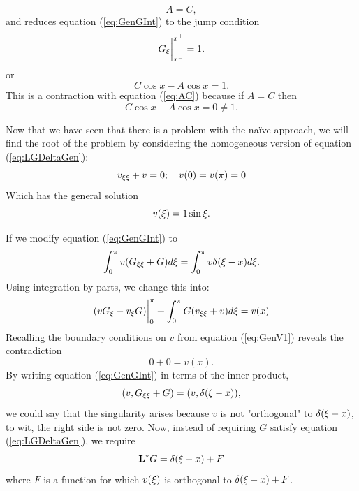     \begin{equation}\label{eq:AC}
        A=C,
    \end{equation}
    and reduces equation (\ref{eq:GenGInt}) to the jump condition 
    \begin{equation}\label{eq:genJump}
        G_\xi\biggr\rvert_{x^-}^{x^+} = 1.
    \end{equation}
    or
    \begin{equation*}
        C\cos x - A\cos x = 1.
    \end{equation*}
    This is a contraction with equation (\ref{eq:AC}) because if \(A=C\) then 
    \begin{equation*}
        C\cos x -A\cos x = 0 \neq 1.
    \end{equation*}

    Now that we have seen that there is a problem with the na\"ive approach, we will find the root of the problem by considering the homogeneous version of equation (\ref{eq:LGDeltaGen}):
    \begin{equation}\label{eq:GenV1}
        v_{\xi\xi} + v = 0;\quad v(0)=v(\pi)=0
    \end{equation}
    Which has the general solution 
    \begin{equation*}
        v(\xi) = 1 \sin \xi.
    \end{equation*}

    If we modify equation (\ref{eq:GenGInt}) to 
    \begin{equation}\label{eq:innerCont}
            \int_{0}^{\pi} v(G_{\xi\xi}+G) d\xi = \int_{0}^{\pi} v\delta(\xi-x) d\xi.
    \end{equation}
    Using integration by parts, we change this into:
    \begin{equation*}
        (vG_\xi - v_\xi G)\biggr\rvert_{0}^{\pi} + \int_{0}^{\pi} G(v_{\xi\xi}+v)d\xi = v(x) 
    \end{equation*}
    Recalling the boundary conditions on \(v\) from equation (\ref{eq:GenV1}) reveals the contradiction
    \begin{equation*}
        0+0 = v(x).
    \end{equation*}
    By writing equation (\ref{eq:GenGInt}) in terms of the inner product,
    \begin{equation*}
        (v, G_{\xi\xi}+G) = (v, \delta(\xi-x)),
    \end{equation*}
    we could say that the singularity arises because \(v\) is not "orthogonal" to \(\delta(\xi-x)\), to wit, the right side is not zero. Now, instead of requiring \(G\) satisfy equation (\ref{eq:LGDeltaGen}), we require
    \begin{equation}\label{eq:GenCorrection}
        \mathrm{\bf{L^*}} G = \delta(\xi-x) + F
    \end{equation}
    where \(F\) is a function for which \(v(\xi)\) is orthogonal to \(\delta(\xi-x) + F\). 

